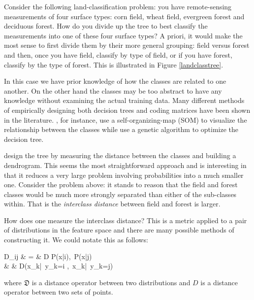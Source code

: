 Consider the following land-classification problem: you have remote-sensing measurements of four surface types: corn field, wheat field, evergreen forest and deciduous forest.
How do you divide up the tree to best classify the measurements into one of these four surface types?
A priori, it would make the most sense to first divide them by their more general grouping: field versus forest and then, once you have field, classify by type of field, or if you have forest, classify by the type of forest.
This is illustrated in Figure \ref{landclasstree}.

In this case we have prior knowledge of how the classes are related to one another.
On the other hand the classes may be too abstract to have any knowledge without examining the actual training data.
Many different methods of empirically designing both decision trees and coding matrices have been shown in the literature.
\citet{Cheong_etal2004}, for instance, use a self-organizing-map (SOM)
\citep{Kohonen2000} to visualize the relationship between the classes while
\citet{Lee_Oh2003} use a genetic algorithm to optimize the decision tree.

\citet{Benabdeslem_Bennani2006} design the tree by measuring the distance between
the classes and building a dendrogram.
This seems the most straightforward approach and is interesting in that it reduces a very large problem involving probabilities into a much smaller one.
Consider the problem above: it stands to reason that the field and forest classes would be much more strongly separated than either of the sub-classes within.
That is the {\it interclass distance} between field and forest is larger.

How does one measure the interclass distance? 
This is a metric applied to a pair of distributions in the feature space
and there are many possible methods of constructing it.
We could notate this as follows:
\begin{eqnarraynon}
	D_{ij} & = & \mathfrak D \left \lbrace P(\vec x|i),~P(\vec x|j) \right \rbrace \\
	       & \approx & D\left (\lbrace \vec x_k|~y_k=i \rbrace,~\lbrace \vec x_k|~y_k=j\rbrace \right )
\end{eqnarraynon}
where $\mathfrak D$ is a distance operator between two distributions and $D$ is a distance operator between two sets of points.

